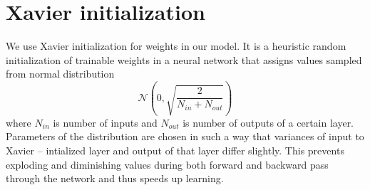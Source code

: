 \documentclass[licencjacka,en]{pracamgr}
\begin{document}
	\xavier
	
	\section{Xavier initialization}
	We use Xavier initialization \cite{XAVIER} for weights in our model. It is a heuristic random initialization of trainable weights in a neural network that assigns values sampled from normal distribution $$\mathcal{N}\left(0, \sqrt{\frac{2}{N_{in} + N_{out}}}\right)$$ where $N_{in}$ is number of inputs and $N_{out}$ is number of outputs of a certain layer. Parameters of the distribution are chosen in such a way that variances of input to Xavier -- intialized layer and output of that layer differ slightly. This prevents exploding and diminishing values during both forward and backward pass through the network and thus speeds up learning.
	
\end{document}
